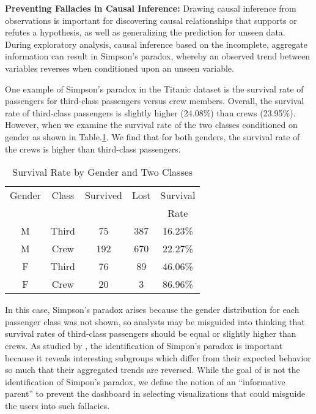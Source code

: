 \textbf{Preventing Fallacies in Causal Inference:} Drawing causal inference from observations is important for discovering causal relationships that supports or refutes a hypothesis, as well as generalizing the prediction for unseen data. During exploratory analysis, causal inference based on the incomplete, aggregate information can result in Simpson's paradox, whereby an observed trend between variables reverses when conditioned upon an unseen variable. 
\par One example of Simpson's paradox in the Titanic dataset is the survival rate of passengers for third-class passengers versus crew members. Overall, the survival rate of third-class passengers is slightly higher (24.08\%) than crews (23.95\%). However, when we examine the survival rate of the two classes conditioned on gender as shown in Table.\ref{tab:t2}. We find that for both genders, the survival rate of the crews is higher than third-class passengers.  
\begin{table}[thb]
	\caption{Survival Rate by Gender and Two Classes}
    \label{tab:t2}
	\begin{center}    
	\begin{tabular}{ccccc}
	\toprule
	Gender & Class & Survived & Lost & Survival\\
	& & & & Rate\\
	\midrule
	M & Third & 75 & 387 & 16.23\%\\ 
	M & Crew & 192 & 670 & 22.27\%\\ 
	\bottomrule
    F & Third & 76 & 89 & 46.06\%\\ 
	F & Crew & 20 & 3 & 86.96\%\\ 
	\bottomrule
	\end{tabular}
    \end{center}
\end{table}
In this case, Simpson's paradox arises because the gender distribution for each passenger class was not shown, so analysts may be misguided into thinking that survival rates of third-class passengers should be equal or slightly higher than crews.
As studied by \cite{Alipourfard2018,Guo2017}, the identification of Simpon's paradox is important because it reveals interesting subgroups which differ from their expected behavior so much that their aggregated trends are reversed. While the goal of \system is not the identification of Simpon's paradox, we define the notion of an ``informative parent'' to prevent the dashboard in selecting visualizations that could misguide the users into such fallacies. 

